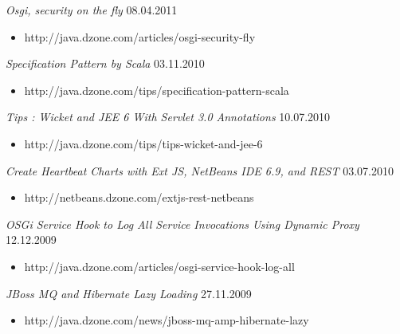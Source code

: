 \documentclass{res}
\begin{document}
\begin{resume}
{{\sl Osgi, security on the fly}  \hfill    08.04.2011	\\
\vspace{-5mm}  \begin{itemize}
\item[]  \scriptsize http://java.dzone.com/articles/osgi-security-fly
\end{itemize}
\vspace{-2mm}

{\sl Specification Pattern by Scala}  \hfill   03.11.2010	\\
\vspace{-5mm}  \begin{itemize}
\item[]  \scriptsize http://java.dzone.com/tips/specification-pattern-scala
\end{itemize}
\vspace{-2mm}

{\sl Tips : Wicket and JEE 6 With Servlet 3.0 Annotations}  \hfill  10.07.2010	\\
\vspace{-5mm}  \begin{itemize}
\item[]  \scriptsize http://java.dzone.com/tips/tips-wicket-and-jee-6
\end{itemize}
\vspace{-2mm}

{\sl Create Heartbeat Charts with Ext JS, NetBeans IDE 6.9, and REST}  \hfill    03.07.2010	\\
\vspace{-5mm}  \begin{itemize}
\item[]  \scriptsize http://netbeans.dzone.com/extjs-rest-netbeans
\end{itemize}
\vspace{-2mm}

{\sl OSGi Service Hook to Log All Service Invocations Using Dynamic Proxy}  \hfill    12.12.2009	\\
\vspace{-5mm}  \begin{itemize}
\item[]  \scriptsize http://java.dzone.com/articles/osgi-service-hook-log-all
\end{itemize}
\vspace{-2mm}

{\sl JBoss MQ and Hibernate Lazy Loading}  \hfill    27.11.2009	\\
\vspace{-5mm}  \begin{itemize}
\item[]  \scriptsize http://java.dzone.com/news/jboss-mq-amp-hibernate-lazy
\end{itemize}
\vspace{-2mm}

}
\end{resume}
\end{document}
